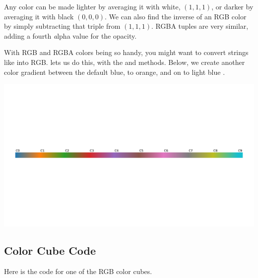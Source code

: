 Any color can be made lighter by averaging it with white, $(1,1,1)$, or darker by averaging it with black $(0,0,0)$. We can also find the inverse of an RGB color by simply subtracting that triple from  $(1,1,1)$. RGBA tuples are very similar, adding a fourth \emph{a}lpha value for the opacity. 


With RGB and RGBA colors being so handy, you might want to convert strings like  into RGB.  lets us do this, with the  and  methods. Below, we create another color gradient between the default  blue, to  orange, and on to light blue .


\begin{center}
    \includegraphics[width = .8\textwidth]{figures/proseplots/color-map.pdf}
\end{center}



\subsection*{Color Cube Code}
Here is the code for one of the RGB color cubes.  

